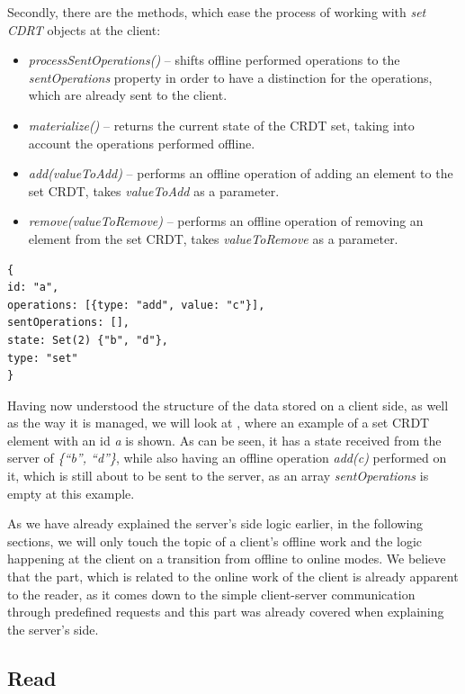 Secondly, there are the methods, which ease the process of working with \textit{set CDRT} objects at the client: 

         \begin{itemize}
         \item \textit{processSentOperations()} -- shifts offline performed operations to the \textit{sentOperations} property in order to have a distinction for the operations, which are already sent to the client.
         \item \textit{materialize()} -- returns the current state of the CRDT set, taking into account the operations performed offline.
         \item \textit{add(valueToAdd)} -- performs an offline operation of adding an element to the set CRDT, takes \textit{valueToAdd} as a parameter.
          \item \textit{remove(valueToRemove)} -- performs an offline operation of removing an element from the set CRDT, takes \textit{valueToRemove} as a parameter.
     \end{itemize}

\begin{lstlisting}[caption={An example of a \textit{SetCRDT} object, stored on a client side.}, label={lst:dev8}]
{
id: "a",
operations: [{type: "add", value: "c"}],
sentOperations: [],
state: Set(2) {"b", "d"},
type: "set"
}
\end{lstlisting}
     
Having now understood the structure of the data stored on a client side, as well as the way it is managed, we will look at , where an example of a set CRDT element with an id \textit{a} is shown. As can be seen, it has a state received from the server of \textit{\{``b'', ``d''\}}, while also having an offline operation \textit{add(c)} performed on it, which is still about to be sent to the server, as an array \textit{sentOperations} is empty at this example.

As we have already explained the server's side logic earlier, in the following sections, we will only touch the topic of a client's offline work and the logic happening at the client on a transition from offline to online modes. We believe that the part, which is related to the online work of the client is already apparent to the reader, as it comes down to the simple client-server communication through predefined requests and this part was already covered when explaining the server's side. 

\subsection*{Read}

